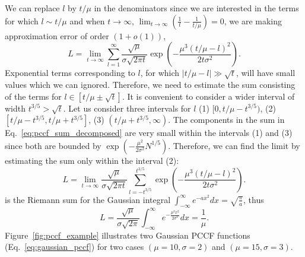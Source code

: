 We can replace $l$ by $t/\mu$ in the denominators since we are interested in the terms for which $l \sim t / \mu$ and when $t \to \infty$, $\lim_{t \to \infty}\left( \frac{1}{t} - \frac{1}{t/\mu} \right)=0$, we are making approximation error of order $(1 + o(1))$,
\begin{equation}
L = \lim_{t\to\infty} \sum_{l=1}^{\infty} \frac{\sqrt{\mu}}{\sigma\sqrt{2\pi t}} \exp\left(-\frac{\mu^3 (t/\mu- l)^2}{2t\sigma^2}\right).
\label{eq:pccf_sum_decomposed}
\end{equation}
Exponential terms corresponding to $l$, for which $|t/\mu - l| \gg \sqrt{t}$, will have small values which we can ignored.
Therefore, we need to estimate the sum consisting of the terms for $l \in [t/\mu \pm \sqrt{t}]$.
It is convenient to consider a wider interval of width $t^{3/5} > \sqrt{t}$.
Let us consider three intervals for $l$
(1) $[0, t/ \mu - t^{3/5})$,
(2) $[t/ \mu - t^{3/5}, t/ \mu + t^{3/5}]$,
(3) $(t/ \mu + t^{3/5}, \infty)$.
The components in the sum in Eq.~\ref{eq:pccf_sum_decomposed} are very small within the intervals (1) and (3) since both are bounded by $\exp(-\frac{\mu^2}{2 \sigma^2} N^{1/5})$.
Therefore, we can find the limit by estimating the sum only within the interval (2):
\begin{equation}
L = \lim_{t\to\infty} \frac{\sqrt{\mu}}{\sigma \sqrt{2\pi t}} \sum_{l=-t^{3/5}}^{t^{3/5}} \exp\left(-\frac{\mu^3 (t/\mu - l)^2}{2t\sigma^2}\right).
\label{eq:sum_before_integral}
\end{equation}
 is the Riemann sum for the Gaussian integral $\int_{-\infty}^{\infty} e^{-a x^2} dx = \sqrt{\frac{\pi}{a}} $, thus
\begin{equation}
L = \frac{\sqrt{\mu}}{\sigma \sqrt{2\pi}} \int_{-\infty}^{\infty} e^{-\frac{\mu^3 x^2}{2\sigma^2}} dx = \frac{1}{\mu}.
\label{eq:pccf_limit_proof}
\end{equation}
Figure~\ref{fig:pccf_example} illustrates two Gaussian PCCF functions (Eq.~\ref{eq:gaussian_pccf}) for two cases $(\mu=10, \sigma=2)$ and $(\mu=15, \sigma=3)$.
